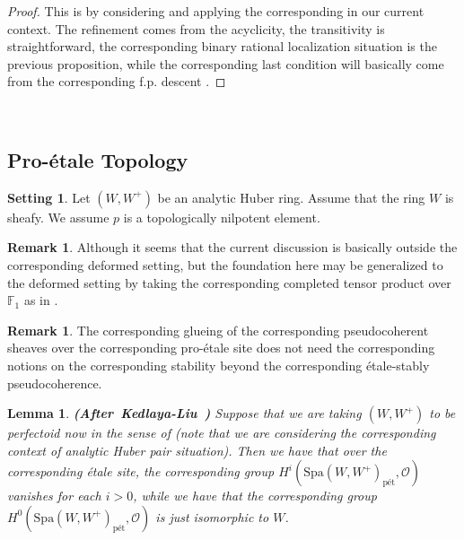 \documentclass[12pt]{amsart}
\newtheorem{lemma}[theorem]{Lemma}
\theoremstyle{definition}
\newtheorem{remark}[theorem]{Remark}
\numberwithin{equation}{section}
\newtheorem{setting}[theorem]{Setting}
\begin{document}
\begin{proof}
This is by considering and applying the corresponding \cite[Lemma 1.10.4]{Ked1} in our current context. The refinement comes from the acyclicity, the transitivity is straightforward, the corresponding binary rational localization situation is the previous proposition, while the corresponding last condition will basically come from the corresponding f.p. descent \cite[Chapitre VIII]{SGAI}.	
\end{proof}






\
\subsection{Pro-\'etale Topology}


\begin{setting}
Let $(W,W^+)$ be an analytic Huber ring. Assume that the ring $W$ is sheafy. We assume $p$ is a topologically nilpotent element.	
\end{setting}

\begin{remark}
Although it seems that the current discussion is basically outside the corresponding deformed setting, but the foundation here may be generalized to the deformed setting by taking the corresponding completed tensor product over $\mathbb{F}_1$ as in \cite{BBBK}.	
\end{remark}



\begin{remark}
The corresponding glueing of the corresponding pseudocoherent sheaves over the corresponding pro-\'etale site does not need the corresponding notions on the corresponding stability beyond the corresponding \'etale-stably pseudocoherence.	
\end{remark}




\begin{lemma} \mbox{\bf{(After Kedlaya-Liu \cite[Proposition 3.4.3]{KL2})}}
Suppose that we are taking $(W,W^+)$ to be perfectoid now in the sense of \cite[Definition 2.1.1]{Ked1} (note that we are considering the corresponding context of analytic Huber pair situation). Then we have that over the corresponding \'etale site, the corresponding group $H^i(\mathrm{Spa}(W,W^+)_\text{p\'et},\mathcal{O})$ vanishes for each $i>0$, while we have that the corresponding group $H^0(\mathrm{Spa}(W,W^+)_\text{p\'et},\mathcal{O})$ is just isomorphic to $W$.	
\end{lemma}
\end{document}
